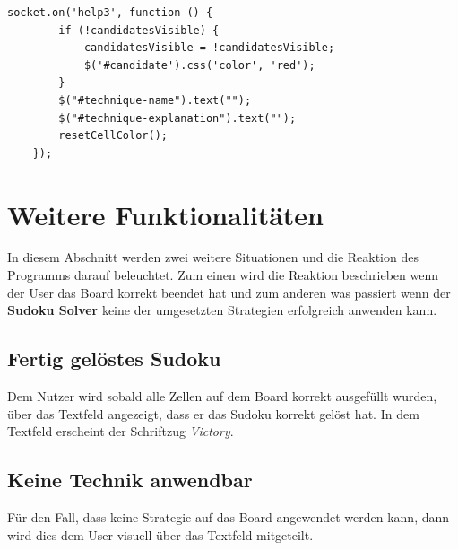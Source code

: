 \begin{lstlisting}[caption={Vierte Hilfestellung}, label={lst:help3}]
	socket.on('help3', function () {
		if (!candidatesVisible) {
			candidatesVisible = !candidatesVisible;
			$('#candidate').css('color', 'red');
		}
		$("#technique-name").text("");
		$("#technique-explanation").text("");
		resetCellColor();
	});

\end{lstlisting}

\section{Weitere Funktionalitäten}
In diesem Abschnitt werden zwei weitere Situationen und die Reaktion des Programms darauf beleuchtet. Zum einen wird die Reaktion beschrieben wenn der User das Board korrekt beendet hat und zum anderen was passiert wenn der \textbf{Sudoku Solver} keine der umgesetzten Strategien erfolgreich anwenden kann.

\subsection{Fertig gelöstes Sudoku}
Dem Nutzer wird sobald alle Zellen auf dem Board korrekt ausgefüllt wurden, über das Textfeld angezeigt, dass er das Sudoku korrekt gelöst hat. In dem Textfeld erscheint der Schriftzug \textit{Victory}.

\subsection{Keine Technik anwendbar}
Für den Fall, dass keine Strategie auf das Board angewendet werden kann, dann wird dies dem User visuell über das Textfeld mitgeteilt. 